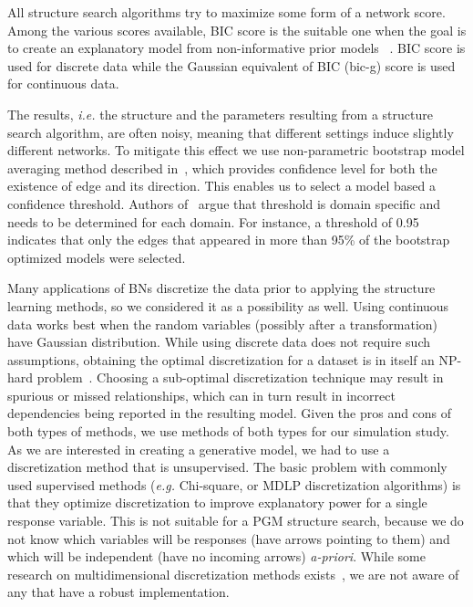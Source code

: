 \documentclass[smallextended]{svjour3}       %
\begin{document}
All structure search algorithms try to maximize some form of a network score. 
Among the various scores available, BIC score is the suitable one when 
the goal is to create an explanatory model from non-informative prior models
~\cite{shmueli2010explain,sober2002instrumentalism}.
BIC score is used for discrete data while the Gaussian 
equivalent of BIC (bic-g) score is used for continuous data.

The results, \emph{i.e.} the structure and the parameters resulting from a structure
search algorithm, are often noisy, meaning that
different settings induce slightly different networks. To mitigate
this effect we use non-parametric bootstrap model averaging method
described in~\cite{friedman1999data}, which provides confidence
level for both the existence of edge and its direction. This enables
us to select a model based a confidence threshold. Authors
of~\cite{friedman1999data} argue that threshold is domain specific
and needs to be determined for each domain. For instance, a threshold of 
 0.95 indicates that  only the edges that appeared in more than
 95\% of the bootstrap optimized models were selected. 
 
Many applications of BNs discretize the data prior to applying
the structure learning methods, so we considered it as a possibility as well.
Using continuous data works best
when the random variables (possibly after a transformation) 
have Gaussian distribution. While using
discrete data does not require such assumptions, obtaining the optimal
discretization for a dataset is in itself an NP-hard
problem~\cite{chlebus1998finding}. Choosing a
sub-optimal discretization technique may result in spurious or
missed relationships, which can in turn result in incorrect
dependencies being reported in the resulting model. Given the pros
and cons of both types of methods, we use methods of both types for
our simulation study. As we are interested in creating a generative model, we had to
use a discretization method that is unsupervised. The basic problem
with commonly used supervised methods (\textit{e.g.} Chi-square, or
MDLP discretization algorithms) is that they optimize
discretization to improve explanatory power for 
a single response variable. This is not suitable for a 
PGM structure search, because we do
not know  which variables will be responses (have arrows
pointing to them) and which will be independent (have no incoming
arrows) {\em a-priori}. While some research on multidimensional
discretization methods exists~\cite{perez2006supervised},
we are not aware of any that have a robust implementation.
\end{document}
